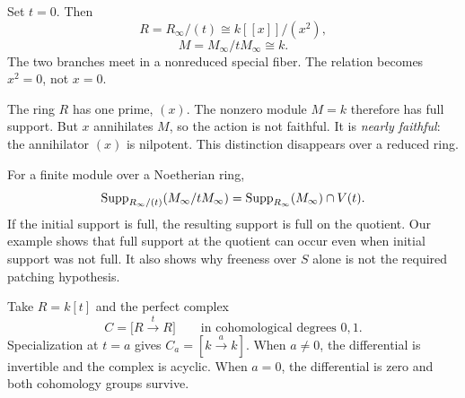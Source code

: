 \begin{minipage}[c]{.47\linewidth}
\end{minipage}\hfill
\begin{minipage}[c]{.49\linewidth}
Set $t=0$. Then
\[
R=R_\infty/(t)\cong k[[x]]/(x^2),
\]
\[
M=M_\infty/tM_\infty\cong k.
\]
The two branches meet in a nonreduced special fiber. The relation becomes $x^2=0$, not $x=0$.
\end{minipage}

The ring $R$ has one prime, $(x)$. The nonzero module $M=k$ therefore has full support. But $x$ annihilates $M$, so the action is not faithful. It is \emph{nearly faithful}: the annihilator $(x)$ is nilpotent. This distinction disappears over a reduced ring.

For a finite module over a Noetherian ring,
\[
\operatorname{Supp}_{R_\infty/(t)}(M_\infty/tM_\infty)
=\operatorname{Supp}_{R_\infty}(M_\infty)\cap V(t).
\]
If the initial support is full, the resulting support is full on the quotient. Our example shows that full support at the quotient can occur even when initial support was not full. It also shows why freeness over $S$ alone is not the required patching hypothesis.


Take $R=k[t]$ and the perfect complex
\[
C=\bigl[R\xrightarrow{\;t\;}R\bigr]
\qquad\text{in cohomological degrees }0,1.
\]
Specialization at $t=a$ gives $C_a=[k\xrightarrow{a}k]$. When $a\ne0$, the differential is invertible and the complex is acyclic. When $a=0$, the differential is zero and both cohomology groups survive.


